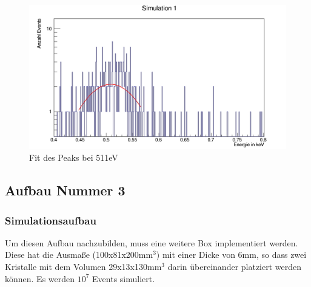 \documentclass[a4paper,11pt,twoside]{article}
\begin{document}
\begin{figure}[H]
	\begin{center}
		\includegraphics[width=0.7\linewidth]{Simulation1_511_fit}
		\caption{Fit des Peaks bei 511eV}
		\label{S1_511_fit}
	\end{center}
\end{figure}		
		
		
		
	\subsection{Aufbau Nummer 3}
		\subsubsection{Simulationsaufbau}
			Um diesen Aufbau nachzubilden, muss eine weitere Box implementiert werden. Diese hat die Ausmaße (100x81x200mm$^3$) mit einer Dicke von 6mm, so dass zwei Kristalle mit dem Volumen 29x13x130mm$^3$ darin übereinander platziert werden können. Es werden $10^7$ Events simuliert. 
			
\end{document}
